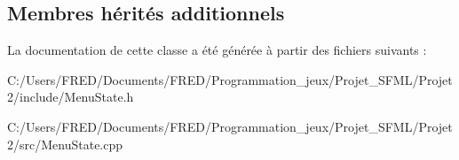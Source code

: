 \subsection*{Membres hérités additionnels}


La documentation de cette classe a été générée à partir des fichiers suivants \+:\begin{DoxyCompactItemize}
\item 
C\+:/\+Users/\+F\+R\+E\+D/\+Documents/\+F\+R\+E\+D/\+Programmation\+\_\+jeux/\+Projet\+\_\+\+S\+F\+M\+L/\+Projet2/include/Menu\+State.\+h\item 
C\+:/\+Users/\+F\+R\+E\+D/\+Documents/\+F\+R\+E\+D/\+Programmation\+\_\+jeux/\+Projet\+\_\+\+S\+F\+M\+L/\+Projet2/src/Menu\+State.\+cpp\end{DoxyCompactItemize}

